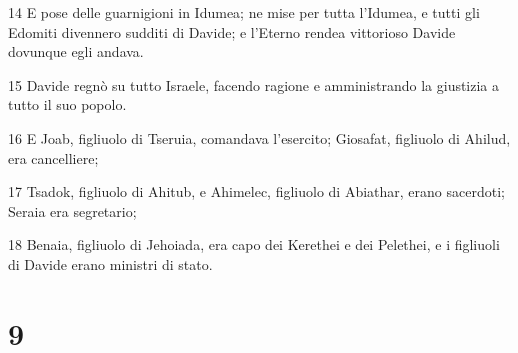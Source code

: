 \par 14 E pose delle guarnigioni in Idumea; ne mise per tutta l'Idumea, e tutti gli Edomiti divennero sudditi di Davide; e l'Eterno rendea vittorioso Davide dovunque egli andava.
\par 15 Davide regnò su tutto Israele, facendo ragione e amministrando la giustizia a tutto il suo popolo.
\par 16 E Joab, figliuolo di Tseruia, comandava l'esercito; Giosafat, figliuolo di Ahilud, era cancelliere;
\par 17 Tsadok, figliuolo di Ahitub, e Ahimelec, figliuolo di Abiathar, erano sacerdoti; Seraia era segretario;
\par 18 Benaia, figliuolo di Jehoiada, era capo dei Kerethei e dei Pelethei, e i figliuoli di Davide erano ministri di stato.

\chapter{9}

